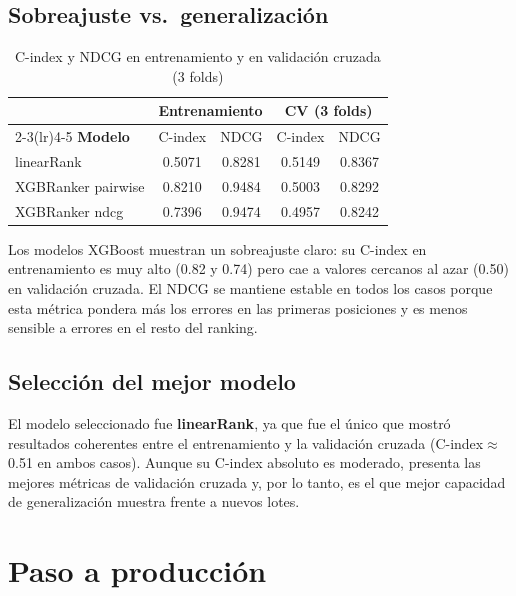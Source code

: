 \documentclass[11pt,a4paper]{article}
\begin{document}
\subsection{Sobreajuste vs.\ generalización}

\begin{table}[H]
\centering
\caption{C-index y NDCG en entrenamiento y en validación cruzada (3 folds)}
\begin{tabular}{lcccc}
\toprule
 & \multicolumn{2}{c}{\textbf{Entrenamiento}} & \multicolumn{2}{c}{\textbf{CV (3 folds)}} \\
\cmidrule(lr){2-3}\cmidrule(lr){4-5}
\textbf{Modelo} & C-index & NDCG & C-index & NDCG \\
\midrule
linearRank         & 0.5071 & 0.8281 & 0.5149 & 0.8367 \\
XGBRanker pairwise & 0.8210 & 0.9484 & 0.5003 & 0.8292 \\
XGBRanker ndcg     & 0.7396 & 0.9474 & 0.4957 & 0.8242 \\
\bottomrule
\end{tabular}
\end{table}

Los modelos XGBoost muestran un sobreajuste claro: su C-index en entrenamiento
es muy alto (0.82 y 0.74) pero cae a valores cercanos al azar (0.50) en
validación cruzada. El NDCG se mantiene estable en todos los casos porque
esta métrica pondera más los errores en las primeras posiciones y es menos
sensible a errores en el resto del ranking.

\subsection{Selección del mejor modelo}

El modelo seleccionado fue \textbf{linearRank}, ya que fue el único que mostró resultados coherentes entre el entrenamiento y la validación cruzada (C-index$\approx$0.51 en ambos casos). Aunque su C-index absoluto es moderado, presenta las mejores métricas de validación cruzada y, por lo tanto, es el que mejor capacidad de generalización muestra frente a nuevos lotes.

\section{Paso a producción}
\end{document}
